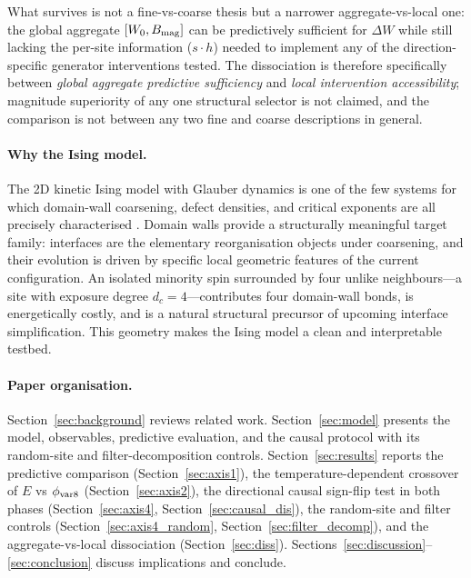 \documentclass[aps,pre,preprint,superscriptaddress,showpacs]{revtex4-2}
\begin{document}
What survives is not a fine-vs-coarse thesis but a narrower
aggregate-vs-local one: the global aggregate $[W_0, B_{\rm mag}]$ can
be predictively sufficient for $\Delta W$ while still lacking the
per-site information ($s\cdot h$) needed to implement any of the
direction-specific generator interventions tested.
The dissociation is therefore specifically between
\emph{global aggregate predictive sufficiency} and
\emph{local intervention accessibility}; magnitude superiority of any
one structural selector is not claimed, and the comparison is not
between any two fine and coarse descriptions in general.

\paragraph{Why the Ising model.}
The 2D kinetic Ising model with Glauber dynamics
\cite{ising1925,glauber1963} is one of the few systems for which
domain-wall coarsening, defect densities, and critical exponents are
all precisely characterised \cite{bray1994}.
Domain walls provide a structurally meaningful target family: interfaces
are the elementary reorganisation objects under coarsening, and their
evolution is driven by specific local geometric features of the current
configuration.
An isolated minority spin surrounded by four unlike neighbours---a
site with exposure degree $d_c = 4$---contributes four domain-wall bonds,
is energetically costly, and is a natural structural precursor of upcoming
interface simplification.
This geometry makes the Ising model a clean and interpretable testbed.

\paragraph{Paper organisation.}
Section~\ref{sec:background} reviews related work.
Section~\ref{sec:model} presents the model, observables, predictive
evaluation, and the causal protocol with its random-site and
filter-decomposition controls.
Section~\ref{sec:results} reports the predictive comparison
(Section~\ref{sec:axis1}), the temperature-dependent crossover of $E$
vs $\phi_{\rm var8}$ (Section~\ref{sec:axis2}), the directional causal
sign-flip test in both phases (Section~\ref{sec:axis4},
Section~\ref{sec:causal_dis}), the random-site and filter
controls (Section~\ref{sec:axis4_random},
Section~\ref{sec:filter_decomp}), and the aggregate-vs-local
dissociation (Section~\ref{sec:diss}).
Sections~\ref{sec:discussion}--\ref{sec:conclusion} discuss
implications and conclude.
\end{document}
